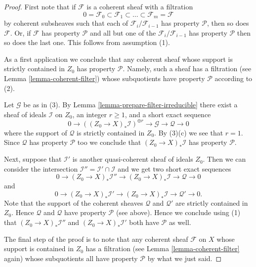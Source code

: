 \begin{proof}
First note that if $\mathcal{F}$ is a coherent sheaf with a filtration
$$
0 = \mathcal{F}_0 \subset \mathcal{F}_1 \subset
\ldots \subset \mathcal{F}_m = \mathcal{F}
$$
by coherent subsheaves such that each of $\mathcal{F}_i/\mathcal{F}_{i - 1}$
has property $\mathcal{P}$, then so does $\mathcal{F}$. Or, if $\mathcal{F}$
has property $\mathcal{P}$ and all but one of the
$\mathcal{F}_i/\mathcal{F}_{i - 1}$ has property $\mathcal{P}$ then
so does the last one. This follows from assumption (1).

\medskip\noindent
As a first application we conclude that any coherent sheaf whose support
is strictly contained in $Z_0$ has property $\mathcal{P}$. Namely, such a
sheaf has a filtration (see Lemma \ref{lemma-coherent-filter})
whose subquotients have property $\mathcal{P}$ according to (2).

\medskip\noindent
Let $\mathcal{G}$ be as in (3). By Lemma \ref{lemma-prepare-filter-irreducible}
there exist a sheaf of ideals $\mathcal{I}$ on $Z_0$, an
integer $r \geq 1$, and a short exact sequence
$$
0 \to
\left((Z_0 \to X)_*\mathcal{I}\right)^{\oplus r} \to
\mathcal{G} \to
\mathcal{Q} \to 0
$$
where the support of $\mathcal{Q}$ is strictly contained in $Z_0$.
By (3)(c) we see that $r = 1$. Since $\mathcal{Q}$ has property $\mathcal{P}$
too we conclude that $(Z_0 \to X)_*\mathcal{I}$ has property
$\mathcal{P}$.

\medskip\noindent
Next, suppose that $\mathcal{I}'$ is another quasi-coherent
sheaf of ideals $Z_0$. Then we can consider the intersection
$\mathcal{I}'' = \mathcal{I}' \cap \mathcal{I}$ and we get
two short exact sequences
$$
0 \to
(Z_0 \to X)_*\mathcal{I}'' \to
(Z_0 \to X)_*\mathcal{I} \to
\mathcal{Q} \to 0
$$
and
$$
0 \to
(Z_0 \to X)_*\mathcal{I}' \to
(Z_0 \to X)_*\mathcal{I} \to
\mathcal{Q}' \to 0.
$$
Note that the support of the coherent sheaves $\mathcal{Q}$ and
$\mathcal{Q}'$ are strictly contained in $Z_0$.
Hence $\mathcal{Q}$ and $\mathcal{Q}$ have property $\mathcal{P}$
(see above). Hence we conclude using (1)
that $(Z_0 \to X)_*\mathcal{I}''$ and $(Z_0 \to X)_*\mathcal{I}'$
both have $\mathcal{P}$ as well.

\medskip\noindent
The final step of the proof is to note that any coherent sheaf
$\mathcal{F}$ on $X$ whose support is contained in $Z_0$ has a filtration
(see Lemma \ref{lemma-coherent-filter} again) whose subquotients
all have property $\mathcal{P}$ by what we just said.
\end{proof}

